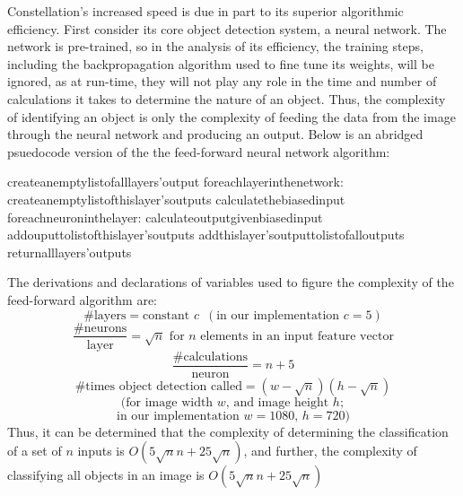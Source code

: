 Constellation's increased speed is due in part to its superior algorithmic efficiency. First consider its core object detection system, a neural network. The network is pre-trained, so in the analysis of its efficiency, the training steps, including the backpropagation algorithm used to fine tune its weights, will be ignored, as at run-time, they will not play any role in the time and number of calculations it takes to determine the nature of an object. Thus, the complexity of identifying an object is only the complexity of feeding the data from the image through the neural network and producing an output. Below is an abridged psuedocode version of the the feed-forward neural network algorithm:
\begin{program}
create\enspace an\enspace empty\enspace list\enspace of\enspace all\enspace layers'\enspace output
for\enspace each\enspace layer\enspace in\enspace the\enspace network:
\enspace\enspace	create\enspace an\enspace empty\enspace list\enspace of\enspace this\enspace layer's\enspace outputs
\enspace\enspace	calculate\enspace the\enspace biased\enspace input
\enspace\enspace	for\enspace each\enspace neuron\enspace in\enspace the\enspace layer:
\enspace\enspace\enspace\enspace		calculate\enspace output\enspace given\enspace biased\enspace input
\enspace\enspace\enspace\enspace		add\enspace ouput\enspace to\enspace list\enspace of\enspace this\enspace layer's\enspace outputs
\enspace\enspace	add\enspace this\enspace layer's\enspace output\enspace to\enspace list\enspace of\enspace all\enspace outputs
return\enspace all\enspace layers'\enspace outputs
\end{program}
The derivations and declarations of variables used to figure the complexity of the feed-forward algorithm are:
$$\text{\# layers}=\text{constant }c \enspace (\text{in our implementation }c=5)$$
$$\frac{\text{\# neurons}}{\text{layer}}=\sqrt{n}\text{ for $n$ elements in an input feature vector}$$
$$\frac{\text{\# calculations}}{\text{neuron}}=n+5$$
$$\text{\# times object detection called}=(w-\sqrt{n})(h-\sqrt{n})$$
$$\text{(for image width }w\text{, and image height }h;$$
$$\text{in our implementation }w=1080\text{, }h=720)$$
Thus, it can be determined that the complexity of determining the classification of a set of $n$ inputs is $O(5\sqrt{n}n+25\sqrt{n})$, and further, the complexity of classifying all objects in an image is $O(5\sqrt{n}n+25\sqrt{n})$